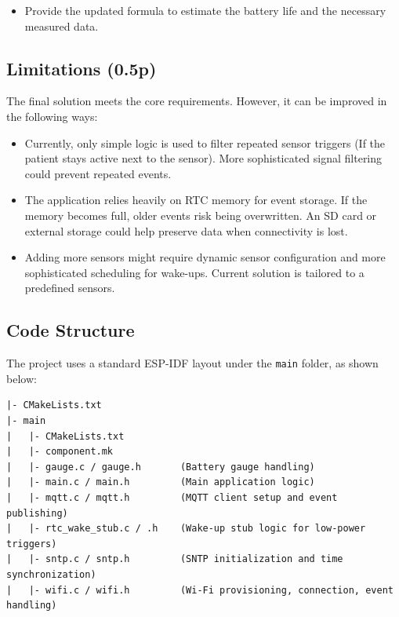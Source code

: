 \documentclass[A4,10pt]{article}
\begin{document}
\begin{itemize}
	\item Provide the updated formula to estimate the battery life and the necessary measured data.
\end{itemize}

\subsection{Limitations (0.5p)}

The final solution meets the core requirements. However, it can be improved in the following ways:
\begin{itemize}
    \item Currently, only simple logic is used to filter repeated sensor triggers (If the patient stays active next to the sensor). More sophisticated signal filtering could prevent repeated events.
    \item The application relies heavily on RTC memory for event storage. If the memory becomes full, older events risk being overwritten. An SD card or external storage could help preserve data when connectivity is lost.
    \item Adding more sensors might require dynamic sensor configuration and more sophisticated scheduling for wake-ups. Current solution is tailored to a predefined sensors.
\end{itemize}

\subsection{Code Structure} The project uses a standard ESP-IDF layout under the \texttt{main} folder, as shown below:
\begin{verbatim}
|- CMakeLists.txt
|- main
|   |- CMakeLists.txt
|   |- component.mk
|   |- gauge.c / gauge.h       (Battery gauge handling)
|   |- main.c / main.h         (Main application logic)
|   |- mqtt.c / mqtt.h         (MQTT client setup and event publishing)
|   |- rtc_wake_stub.c / .h    (Wake-up stub logic for low-power triggers)
|   |- sntp.c / sntp.h         (SNTP initialization and time synchronization)
|   |- wifi.c / wifi.h         (Wi-Fi provisioning, connection, event handling)
\end{verbatim}
\end{document}
